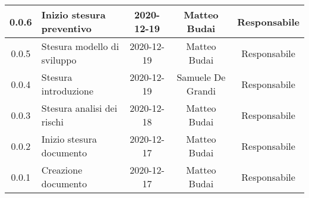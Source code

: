 \begin{center}
\begin{longtable}{|c|p{5cm}|c|c|c|}
	\hline
	0.0.6 & Inizio stesura preventivo & 2020-12-19 & Matteo Budai & Responsabile \\
	\hline
	0.0.5 & Stesura modello di sviluppo & 2020-12-19 & Matteo Budai & Responsabile \\
	\hline
	0.0.4 & Stesura introduzione & 2020-12-19 & Samuele De Grandi & Responsabile \\
	\hline
	0.0.3 & Stesura analisi dei rischi & 2020-12-18 & Matteo Budai & Responsabile \\
	\hline
	0.0.2 & Inizio stesura documento & 2020-12-17 & Matteo Budai & Responsabile \\
	\hline
	0.0.1 & Creazione documento & 2020-12-17 & Matteo Budai & Responsabile \\
	\hline

	\end{longtable}
\end{center}